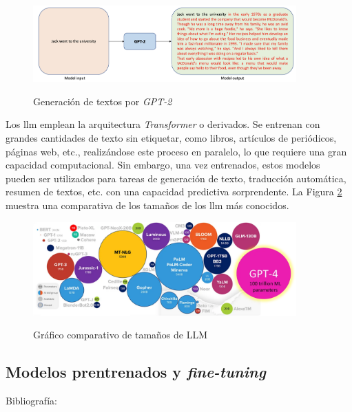 \begin{figure}[H]
    \caption{Generación de textos por \emph{GPT-2}}
    \centering
    \includegraphics[width=0.9\textwidth]{./figuras/GPT2_text_generation.png}
    \label{fig:gpt2_text_generation}
\end{figure}

Los \gls{llm} emplean la arquitectura \emph{Transformer} o derivados. Se entrenan con grandes cantidades de texto sin etiquetar, como libros, artículos de periódicos, páginas web, etc., realizándose este proceso en paralelo, lo que requiere una gran capacidad computacional. Sin embargo, una vez entrenados, estos modelos pueden ser utilizados para tareas de generación de texto, traducción automática, resumen de textos, etc. con una capacidad predictiva sorprendente. La Figura \ref{fig:llm_sizes} muestra una comparativa de los tamaños de los \gls{llm} más conocidos.

\begin{figure}[H]
    \caption{Gráfico comparativo de tamaños de LLM}
    \centering
    \includegraphics[width=0.9\textwidth]{./figuras/LLMs_sizes.png}
    \label{fig:llm_sizes}
\end{figure}

\subsection{Modelos prentrenados y \emph{fine-tuning}} 
Bibliografía: \cite{chamandFinetuneYourClassifier2022}

